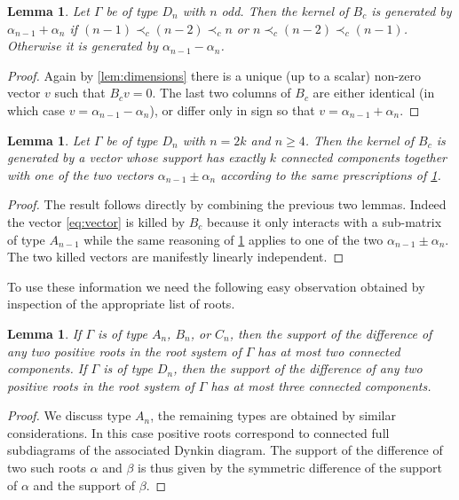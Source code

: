 \documentclass[pdftex]{sigma}
\numberwithin{equation}{section}
\numberwithin{figure}{section}
\newtheorem{Lemma}[Theorem]{Lemma}
\begin{document}
  \begin{Lemma}
    \label{lem:ker_Dn_even}
    Let $\Gamma$ be of type $D_n$ with $n$ odd.
    Then the kernel of $B_c$ is generated by $\alpha_{n-1}+\alpha_n$ if $(n-1) \prec_c (n-2) \prec_c n$ or $n \prec_c (n-2) \prec_c (n-1)$.
    Otherwise it is generated by $\alpha_{n-1}-\alpha_n$.
  \end{Lemma}
  \begin{proof}
    Again by \cref{lem:dimensions} there is a unique (up to a scalar) non-zero vector $v$ such that $B_cv=0$.
    The last two columns of $B_c$ are either identical (in which case $v=\alpha_{n-1}-\alpha_n$), or differ only in sign so that $v=\alpha_{n-1}+\alpha_n$.
  \end{proof}

  \begin{Lemma}
    Let $\Gamma$ be of type $D_n$ with $n=2k$ and $n\geq 4$.
    Then the kernel of $B_c$ is generated by a vector whose support has exactly $k$ connected components together with one of the two vectors $\alpha_{n-1}\pm\alpha_n$ according to the same prescriptions of \cref{lem:ker_Dn_even}.
  \end{Lemma}
  \begin{proof}
    The result follows directly by combining the previous two lemmas.
    Indeed the vector \cref{eq:vector} is killed by $B_c$ because it only interacts with a sub-matrix of type $A_{n-1}$ while the same reasoning of \cref{lem:ker_Dn_even} applies to one of the two $\alpha_{n-1}\pm\alpha_n$.
    The two killed vectors are manifestly linearly independent.
  \end{proof}

  To use these information we need the following easy observation obtained by inspection of the appropriate list of roots.
  \begin{Lemma}
    \label{lem:components}
    If $\Gamma$ is of type $A_n$, $B_n$, or $C_n$, then the support of the difference of any two positive roots in the root system of $\Gamma$ has at most two connected components.
    If $\Gamma$ is of type $D_n$, then the support of the difference of any two positive roots in the root system of $\Gamma$ has at most three connected components.
  \end{Lemma}
  \begin{proof}
    We discuss type $A_n$, the remaining types are obtained by similar considerations.
    In this case positive roots correspond to connected full subdiagrams of the associated Dynkin diagram.
    The support of the difference of two such roots $\alpha$ and $\beta$ is thus given by the symmetric difference of the support of $\alpha$ and the support of $\beta$.
  \end{proof}
\end{document}
